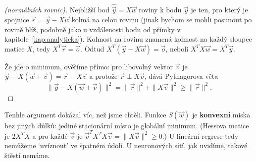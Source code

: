 \begin{center}
\end{center}

\begin{proof}[(normálních rovnic)]
  Nejbližší bod $\hat{\vec{y}} = X\vec{w}$ roviny k bodu $\vec{y}$ je ten, pro který je spojnice $\vec{r} = \vec{y} - X\vec{w}$ kolmá na celou rovinu (jinak bychom se mohli posunout po rovině blíž, podobně jako u vzdálenosti bodu od přímky v kapitole~\ref{kap:analyticka}). Kolmost na rovinu znamená kolmost na každý sloupec matice $X$, tedy $X^T\vec{r} = \vec{o}$. Odtud $X^T(\vec{y} - X\vec{w}) = \vec{o}$, neboli $X^TX\vec{w} = X^T\vec{y}$.

  Že jde o minimum, ověříme přímo: pro libovolný vektor $\vec{v}$ je $\vec{y} - X(\vec{w} + \vec{v}) = \vec{r} - X\vec{v}$ a protože $\vec{r}\perp X\vec{v}$, dává Pythagorova věta
  \begin{equation*}
    \|\vec{y} - X(\vec{w} + \vec{v})\|^2 = \|\vec{r}\|^2 + \|X\vec{v}\|^2\geq\|\vec{r}\|^2.
  \end{equation*}
\end{proof}

Tenhle argument dokázal víc, než jsme chtěli. Funkce $S(\vec{w})$ je \textbf{konvexní} miska bez jiných důlků: jediné stacionární místo je globální minimum. (Hessova matice je $2X^TX$ a pro každé $\vec{v}$ je $\vec{v}^TX^TX\vec{v} = \|X\vec{v}\|^2\geq 0$.) U lineární regrese tedy nemůžeme `uvíznout' ve špatném údolí. U neuronových sítí, jak uvidíme, takové štěstí nemáme.

